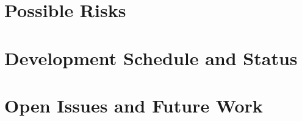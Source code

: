 \documentclass[12pt,a4paper]{article}
\begin{document}
\section{Possible Risks}

\section{Development Schedule and Status}

\section{Open Issues and Future Work}


\newpage
{}


\end{document}
